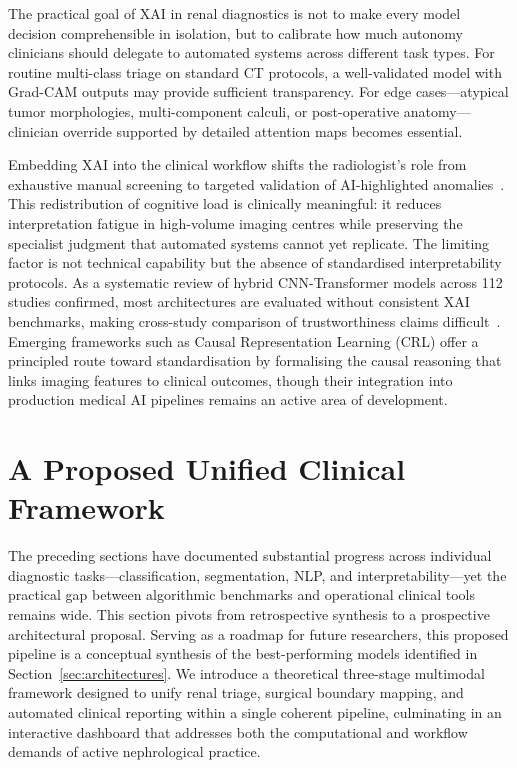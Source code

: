 The practical goal of XAI in renal diagnostics is not to make every model decision comprehensible in isolation, but to calibrate how much autonomy clinicians should delegate to automated systems across different task types. For routine multi-class triage on standard CT protocols, a well-validated model with Grad-CAM outputs may provide sufficient transparency. For edge cases---atypical tumor morphologies, multi-component calculi, or post-operative anatomy---clinician override supported by detailed attention maps becomes essential.

Embedding XAI into the clinical workflow shifts the radiologist's role from exhaustive manual screening to targeted validation of AI-highlighted anomalies~\cite{abdelrahman2022deep}. This redistribution of cognitive load is clinically meaningful: it reduces interpretation fatigue in high-volume imaging centres while preserving the specialist judgment that automated systems cannot yet replicate. The limiting factor is not technical capability but the absence of standardised interpretability protocols. As a systematic review of hybrid CNN-Transformer models across 112 studies confirmed, most architectures are evaluated without consistent XAI benchmarks, making cross-study comparison of trustworthiness claims difficult~\cite{papanastasiou2024systematic}. Emerging frameworks such as Causal Representation Learning (CRL) offer a principled route toward standardisation by formalising the causal reasoning that links imaging features to clinical outcomes, though their integration into production medical AI pipelines remains an active area of development.



\section{A Proposed Unified Clinical Framework}
\label{sec:framework}

The preceding sections have documented substantial progress across individual diagnostic tasks---classification, segmentation, NLP, and interpretability---yet the practical gap between algorithmic benchmarks and operational clinical tools remains wide. This section pivots from retrospective synthesis to a prospective architectural proposal. Serving as a roadmap for future researchers, this proposed pipeline is a conceptual synthesis of the best-performing models identified in Section~\ref{sec:architectures}. We introduce a theoretical three-stage multimodal framework designed to unify renal triage, surgical boundary mapping, and automated clinical reporting within a single coherent pipeline, culminating in an interactive dashboard that addresses both the computational and workflow demands of active nephrological practice.

